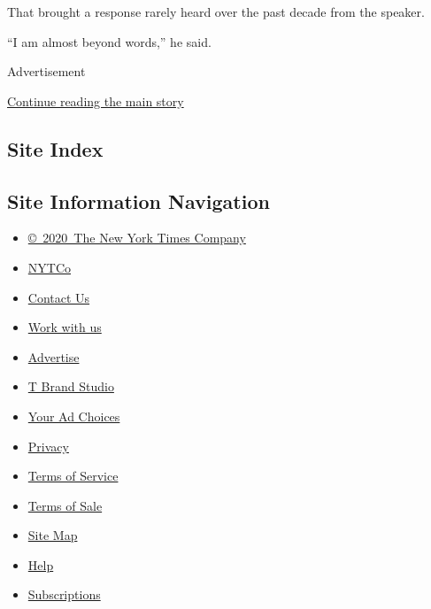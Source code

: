 That brought a response rarely heard over the past decade from the
speaker.

``I am almost beyond words,'' he said.

Advertisement

\protect\hyperlink{after-bottom}{Continue reading the main story}

\hypertarget{site-index}{%
\subsection{Site Index}\label{site-index}}

\hypertarget{site-information-navigation}{%
\subsection{Site Information
Navigation}\label{site-information-navigation}}

\begin{itemize}
\tightlist
\item
  \href{https://help.nytimes.com/hc/en-us/articles/115014792127-Copyright-notice}{©~2020~The
  New York Times Company}
\end{itemize}

\begin{itemize}
\tightlist
\item
  \href{https://www.nytco.com/}{NYTCo}
\item
  \href{https://help.nytimes.com/hc/en-us/articles/115015385887-Contact-Us}{Contact
  Us}
\item
  \href{https://www.nytco.com/careers/}{Work with us}
\item
  \href{https://nytmediakit.com/}{Advertise}
\item
  \href{http://www.tbrandstudio.com/}{T Brand Studio}
\item
  \href{https://www.nytimes.com/privacy/cookie-policy\#how-do-i-manage-trackers}{Your
  Ad Choices}
\item
  \href{https://www.nytimes.com/privacy}{Privacy}
\item
  \href{https://help.nytimes.com/hc/en-us/articles/115014893428-Terms-of-service}{Terms
  of Service}
\item
  \href{https://help.nytimes.com/hc/en-us/articles/115014893968-Terms-of-sale}{Terms
  of Sale}
\item
  \href{https://spiderbites.nytimes.com}{Site Map}
\item
  \href{https://help.nytimes.com/hc/en-us}{Help}
\item
  \href{https://www.nytimes.com/subscription?campaignId=37WXW}{Subscriptions}
\end{itemize}
